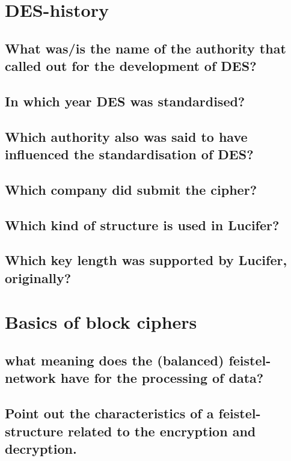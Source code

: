 \section{DES-history}

\subsection{What was/is the name of the authority that called out for the development of DES?}
\label{section:1a}

\subsection{In which year DES was standardised?}
\label{section:1b}

\subsection{Which authority also was said to have influenced the standardisation of DES?}
\label{section:1c}

\subsection{Which company did submit the cipher?}
\label{section:1d}

\subsection{Which kind of structure is used in Lucifer?}
\label{section:1e}

\subsection{Which key length was supported by Lucifer, originally?}
\label{section:1f}


\section{Basics of block ciphers}

\subsection{what meaning does the (balanced) feistel-network have for the processing of data?}
\label{section:2a}

\subsection{Point out the characteristics of a feistel-structure related to the encryption and decryption.}
\label{section:2b}


